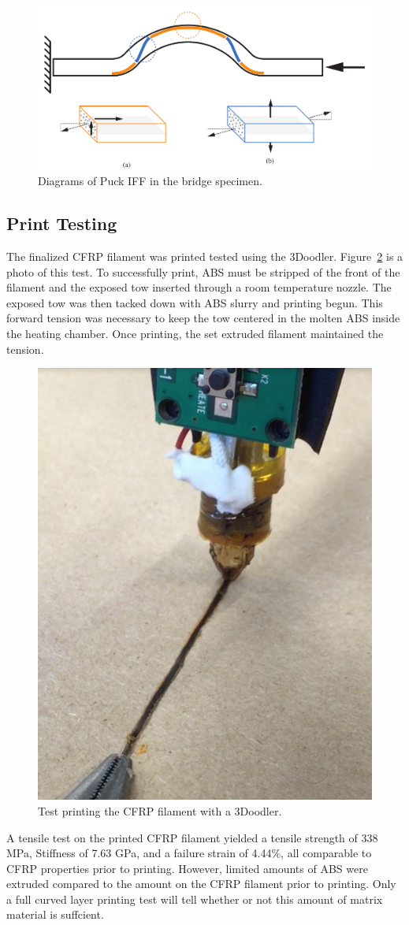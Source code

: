 \begin{figure}[t]
\centering
\includegraphics[width=0.8\linewidth]{./figures/fea/puck-failure-qualitative}
\caption{Diagrams of Puck IFF in the bridge specimen.}
\label{fig:puck-failure-qualitative}
\end{figure}


\subsection*{Print Testing}

The finalized CFRP filament was printed tested using the 3Doodler. Figure~\ref{fig:filament-print-3doodler-during} is a photo of this test. To successfully print, ABS must be stripped of the front of the filament and the exposed tow inserted through a room temperature nozzle. The exposed tow was then tacked down with ABS slurry and printing begun. This forward tension was necessary to keep the tow centered in the molten ABS inside the heating chamber. Once printing, the set extruded filament maintained the tension.

\begin{figure}[t]
\centering
\includegraphics[width=0.5\linewidth]{./figures/filament-print-3doodler-during}
\caption{Test printing the CFRP filament with a 3Doodler.}
\label{fig:filament-print-3doodler-during}
\end{figure}

A tensile test on the printed CFRP filament yielded a tensile strength of 338 MPa, Stiffness of 7.63 GPa, and a failure strain of 4.44\%, all comparable to CFRP properties prior to printing. However, limited amounts of ABS were extruded compared to the amount on the CFRP filament prior to printing. Only a full curved layer printing test will tell whether or not this amount of matrix material is suffcient. 